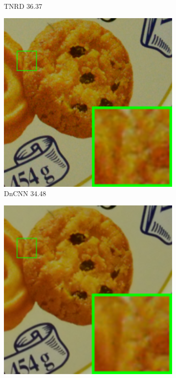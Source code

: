 \begin{figure}
\begin{subfigure}[t]{0.19\textwidth}
\caption{TNRD 36.37}
    \end{subfigure}
    \hfill
    \begin{subfigure}[t]{0.19\textwidth}
        \centering
        \includegraphics[width=1\textwidth]{images/guided/cc15/resize_br_DnCNN_d600_iso3200_2_real.png}
\caption{DnCNN 34.48}
    \end{subfigure}
\hfill
    \begin{subfigure}[t]{0.19\textwidth}
        \centering
        \includegraphics[width=1\textwidth]{images/guided/cc15/resize_br_NI_d600_iso3200_2_real.png}

\end{subfigure}
\end{figure}

